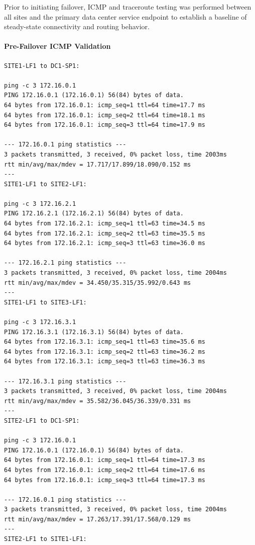 \documentclass[11pt]{article}
\begin{document}
Prior to initiating failover, ICMP and traceroute testing was performed between all sites and the primary data center service endpoint to establish a baseline of steady-state connectivity and routing behavior.

\paragraph{Pre-Failover ICMP Validation}

\begin{verbatim}
SITE1-LF1 to DC1-SP1:

ping -c 3 172.16.0.1
PING 172.16.0.1 (172.16.0.1) 56(84) bytes of data.
64 bytes from 172.16.0.1: icmp_seq=1 ttl=64 time=17.7 ms
64 bytes from 172.16.0.1: icmp_seq=2 ttl=64 time=18.1 ms
64 bytes from 172.16.0.1: icmp_seq=3 ttl=64 time=17.9 ms

--- 172.16.0.1 ping statistics ---
3 packets transmitted, 3 received, 0% packet loss, time 2003ms
rtt min/avg/max/mdev = 17.717/17.899/18.090/0.152 ms
---
SITE1-LF1 to SITE2-LF1:

ping -c 3 172.16.2.1
PING 172.16.2.1 (172.16.2.1) 56(84) bytes of data.
64 bytes from 172.16.2.1: icmp_seq=1 ttl=63 time=34.5 ms
64 bytes from 172.16.2.1: icmp_seq=2 ttl=63 time=35.5 ms
64 bytes from 172.16.2.1: icmp_seq=3 ttl=63 time=36.0 ms

--- 172.16.2.1 ping statistics ---
3 packets transmitted, 3 received, 0% packet loss, time 2004ms
rtt min/avg/max/mdev = 34.450/35.315/35.992/0.643 ms
---
SITE1-LF1 to SITE3-LF1:

ping -c 3 172.16.3.1
PING 172.16.3.1 (172.16.3.1) 56(84) bytes of data.
64 bytes from 172.16.3.1: icmp_seq=1 ttl=63 time=35.6 ms
64 bytes from 172.16.3.1: icmp_seq=2 ttl=63 time=36.2 ms
64 bytes from 172.16.3.1: icmp_seq=3 ttl=63 time=36.3 ms

--- 172.16.3.1 ping statistics ---
3 packets transmitted, 3 received, 0% packet loss, time 2004ms
rtt min/avg/max/mdev = 35.582/36.045/36.339/0.331 ms
---
SITE2-LF1 to DC1-SP1:

ping -c 3 172.16.0.1
PING 172.16.0.1 (172.16.0.1) 56(84) bytes of data.
64 bytes from 172.16.0.1: icmp_seq=1 ttl=64 time=17.3 ms
64 bytes from 172.16.0.1: icmp_seq=2 ttl=64 time=17.6 ms
64 bytes from 172.16.0.1: icmp_seq=3 ttl=64 time=17.3 ms

--- 172.16.0.1 ping statistics ---
3 packets transmitted, 3 received, 0% packet loss, time 2004ms
rtt min/avg/max/mdev = 17.263/17.391/17.568/0.129 ms
---
SITE2-LF1 to SITE1-LF1:


\end{verbatim}
\end{document}
